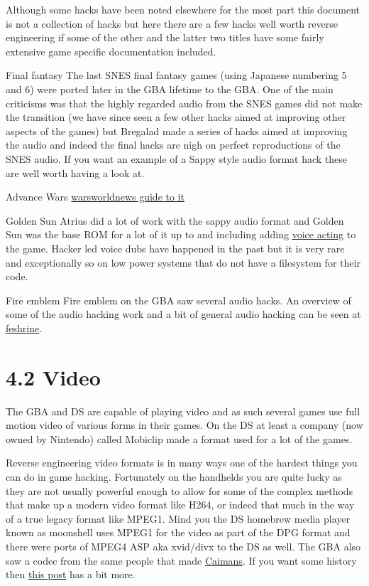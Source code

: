 \documentclass[
]{book}
\begin{document}
Although some hacks have been noted elsewhere for the most part this document is not a collection of hacks but here there are a few hacks well worth reverse engineering if some of the other and the latter two titles have some fairly extensive game specific documentation included.

Final fantasy The last SNES final fantasy games (using Japanese numbering 5 and 6) were ported later in the GBA lifetime to the GBA. One of the main criticisms was that the highly regarded audio from the SNES games did not make the transition (we have since seen a few other hacks aimed at improving other aspects of the games) but Bregalad made a series of hacks aimed at improving the audio and indeed the final hacks are nigh on perfect reproductions of the SNES audio. If you want an example of a Sappy style audio format hack these are well worth having a look at.

Advance Wars \href{http://forums.warsworldnews.com/viewtopic.php?t=2002}{warsworldnews guide to it}

Golden Sun Atrius did a lot of work with the sappy audio format and Golden Sun was the base ROM for a lot of it up to and including adding \href{http://forum.goldensunhacking.net/index.php?action=downloads;sa=view;down=4}{voice acting} to the game. Hacker led voice dubs have happened in the past but it is very rare and exceptionally so on low power systems that do not have a filesystem for their code.

Fire emblem Fire emblem on the GBA saw several audio hacks. An overview of some of the audio hacking work and a bit of general audio hacking can be seen at \href{http://www.feshrine.net/ultimatetutorial/}{feshrine}.

\hypertarget{video}{%
\section{4.2 Video}\label{video}}

The GBA and DS are capable of playing video and as such several games use full motion video of various forms in their games. On the DS at least a company (now owned by Nintendo) called Mobiclip made a format used for a lot of the games.

Reverse engineering video formats is in many ways one of the hardest things you can do in game hacking. Fortunately on the handhelds you are quite lucky as they are not usually powerful enough to allow for some of the complex methods that make up a modern video format like H264, or indeed that much in the way of a true legacy format like MPEG1. Mind you the DS homebrew media player known as moonshell uses MPEG1 for the video as part of the DPG format and there were ports of MPEG4 ASP aka xvid/divx to the DS as well. The GBA also saw a codec from the same people that made \href{http://www.ds-video.com/index.htm}{Caimans}. If you want some history then \href{http://gbatemp.net/threads/video-codec-for-gba.354591/\#post-5038482}{this post} has a bit more.
\end{document}
